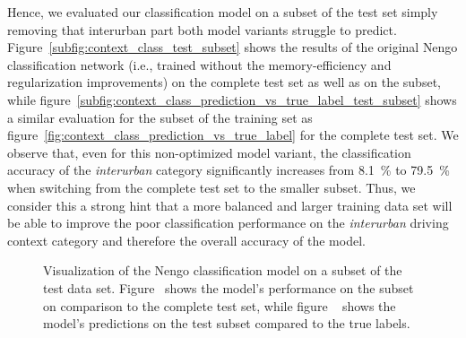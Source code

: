 Hence, we evaluated our classification model on a subset of the test set simply removing that interurban part both model variants struggle to predict.
Figure~\ref{subfig:context_class_test_subset} shows the results of the original \ac{Nengo} classification network (i.e., trained without the memory-efficiency and regularization improvements) on the complete test set as well as on the subset, while figure~\ref{subfig:context_class_prediction_vs_true_label_test_subset} shows a similar evaluation for the subset of the training set as figure~\ref{fig:context_class_prediction_vs_true_label} for the complete test set.
We observe that, even for this non-optimized model variant, the classification accuracy of the \emph{interurban} category significantly increases from \SI{8.1}{\percent} to \SI{79.5}{\percent} when switching from the complete test set to the smaller subset.
Thus, we consider this a strong hint that a more balanced and larger training data set will be able to improve the poor classification performance on the \emph{interurban} driving context category and therefore the overall accuracy of the model.
\begin{figure}[t]
    \centering
    \caption{Visualization of the \ac{Nengo} classification model on a subset of the test data set. 
    Figure~\protect{} shows the model's performance on the subset on comparison to the complete test set, while figure ~\protect{} shows the model's predictions on the test subset compared to the true labels.}
    \label{fig:context_class_test_subset}
\end{figure}


